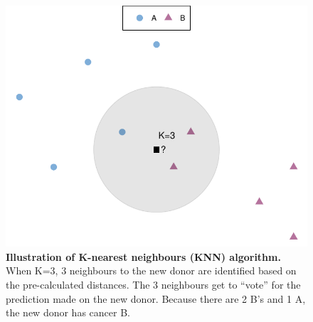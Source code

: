 \begin{figure}[h!]
    \centering
    \includegraphics[scale=0.8]{graphics/knn_demo.pdf}
    \caption{\textbf{Illustration of K-nearest neighbours (KNN) algorithm.} When K=3, 3 neighbours to the new donor are identified based on the pre-calculated distances. The 3 neighbours get to ``vote'' for the prediction made on the new donor. Because there are 2 B's and 1 A, the new donor has cancer B.}
    \label{fig:knn_demo}
\end{figure}
